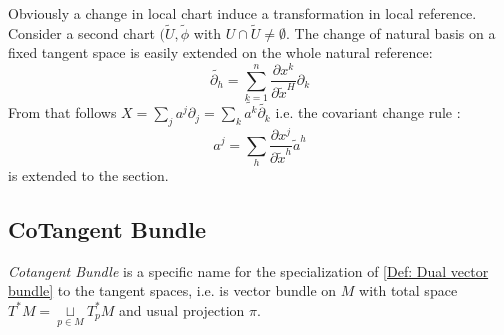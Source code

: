 \documentclass[a4paper,12pt]{scrartcl}    %
\begin{document}
\begin{observation}
	Obviously a change in local chart induce a transformation in local reference.
	\\
	Consider a second chart $( \tilde{U}, \tilde{\phi}$ with $ U \cap \tilde{U} \neq \emptyset$.
	The change of natural basis on a fixed tangent space is easily extended on the whole natural reference:
	\begin{equation}\label{eq: controvariant basis}
		\tilde{\partial_h} = \sum_{k=1}^n \frac{\partial x^k}{\partial \tilde{x}^H} \partial_k
	\end{equation}
	From that follows $X= \sum_j a^j \partial_j = \sum_k \tilde{a^k} \tilde{\partial_k} $ i.e. the covariant change rule :
	\begin{displaymath}
		a^j = \sum_h \frac{\partial x^j}{\partial \tilde{x}^h} \tilde{a}^h
	\end{displaymath}
	is extended to the section.
\end{observation}	
	
\subsection{CoTangent Bundle}
\begin{notationfix}
\emph{Cotangent Bundle} is a specific name for the specialization of \ref{Def: Dual vector bundle} to the tangent spaces, i.e. is vector bundle on $M$ with total space $T^*M = \underset{p \in M}{\sqcup}T^*_p M  $ and usual projection $\pi$.
\end{notationfix}
\end{document}
